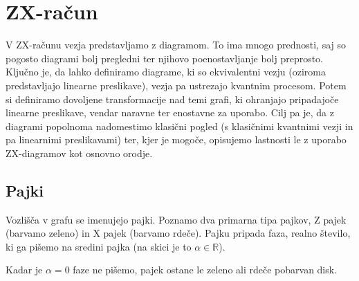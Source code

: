\documentclass[mat1]{fmfdelo}
\newcommand{\R}{\mathbb R}
\begin{document}

\section{ZX-račun}
V ZX-računu vezja predstavljamo z diagramom. To ima mnogo prednosti, saj so pogosto diagrami bolj pregledni ter njihovo poenostavljanje bolj preprosto. Ključno je, da lahko definiramo diagrame, ki so ekvivalentni vezju (oziroma predstavljajo linearne preslikave), vezja pa ustrezajo kvantnim procesom. Potem si definiramo dovoljene transformacije nad temi grafi, ki ohranjajo pripadajoče linearne preslikave, vendar naravne ter enostavne za uporabo. Cilj pa je, da z diagrami popolnoma nadomestimo klasični pogled (s klasičnimi kvantnimi vezji in pa linearnimi preslikavami) ter, kjer je mogoče, opisujemo lastnosti le z uporabo ZX-diagramov kot osnovno orodje.
\subsection{Pajki}
Vozlišča v grafu se imenujejo pajki. Poznamo dva primarna tipa pajkov, Z pajek (barvamo zeleno) in X pajek (barvamo rdeče). Pajku pripada faza, realno število, ki ga pišemo na sredini pajka (na skici je to \(\alpha\in\R\)).
\begin{center}
\end{center}
Kadar je \(\alpha = 0\) faze ne pišemo, pajek ostane le zeleno ali rdeče pobarvan disk.
\end{document}
